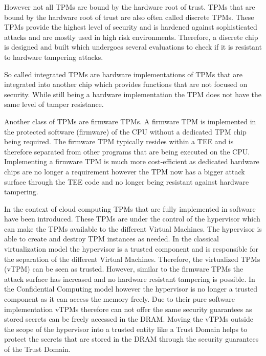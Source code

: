 \documentclass[sigplan,screen,nonacm]{acmart}
\begin{document}
However not all TPMs are bound by the hardware root of trust.
TPMs that are bound by the hardware root of trust are also often called discrete TPMs.
These TPMs provide the highest level of security and is hardened against sophisticated attacks and are mostly used in high risk environments.
Therefore, a discrete chip is designed and built which undergoes several evaluations to check if it is resistant to hardware tampering attacks\cite{TPM-short}.

So called integrated TPMs are hardware implementations of TPMs that are integrated into another chip which provides functions that are not focused on security.
While still being a hardware implementation the TPM does not have the same level of tamper resistance\cite{TPM-short}.

Another class of TPMs are firmware TPMs.
A firmware TPM is implemented in the protected software (firmware) of the CPU without a dedicated TPM chip being required.
The firmware TPM typically resides within a TEE and is therefore separated from other programs that are being executed on the CPU.
Implementing a firmware TPM is much more cost-efficient as dedicated hardware chips are no longer a requirement however the TPM now has a bigger attack surface through the TEE code and no longer being resistant against hardware tampering\cite{TPM-short}.

In the context of cloud computing TPMs that are fully implemented in software have been introduced.
These TPMs are under the control of the hypervisor which can make the TPMs available to the different Virtual Machines.
The hypervisor is able to create and destroy TPM instances as needed.
In the classical virtualization model the hypervisor is a trusted component and is responsible for the separation of the different Virtual Machines.
Therefore, the virtualized TPMs (vTPM) can be seen as trusted.
However, similar to the firmware TPMs the attack surface has increased and no hardware resistant tampering is possible\cite{perez2006vtpm}\cite{vTPM-google}.
In the Confidential Computing model however the hypervisor is no longer a trusted component as it can access the memory freely.
Due to their pure software implementation vTPMs therefore can not offer the same security guarantees as stored secrets can be freely accessed in the DRAM.
Moving the vTPMs outside the scope of the hypervisor into a trusted entity like a Trust Domain helps to protect the secrets that are stored in the DRAM through the security guarantees of the Trust Domain.
\end{document}
